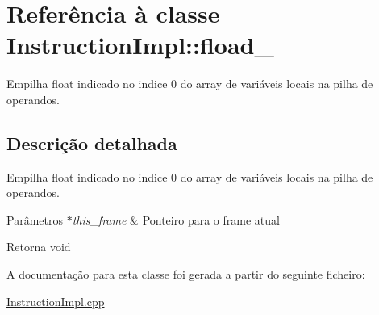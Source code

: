 \hypertarget{class_instruction_impl_1_1fload__0}{}\section{Referência à classe Instruction\+Impl\+:\+:fload\+\_}
\label{class_instruction_impl_1_1fload__0}


Empilha float indicado no indice 0 do array de variáveis locais na pilha de operandos.  




\subsection{Descrição detalhada}
Empilha float indicado no indice 0 do array de variáveis locais na pilha de operandos. 


\begin{DoxyParams}{Parâmetros}
{\em $\ast$this\+\_\+frame} & Ponteiro para o frame atual \\
\hline
\end{DoxyParams}
\begin{DoxyReturn}{Retorna}
void 
\end{DoxyReturn}


A documentação para esta classe foi gerada a partir do seguinte ficheiro\+:\begin{DoxyCompactItemize}
\item 
\hyperlink{_instruction_impl_8cpp}{Instruction\+Impl.\+cpp}\end{DoxyCompactItemize}
